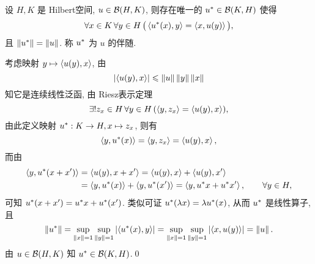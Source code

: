 \begin{Theorem}[伴随算子]
	设 $ H, K $ 是 Hilbert空间, $ u\in \mathcal{B}(H, K) $, 则存在唯一的 $ u^{*}\in \mathcal{B}(K, H) $ 使得
	\[
		\forall x\in K\,\forall y\in H\,\big(\left\langle u^{*}(x), y \right\rangle=\left\langle x, u(y) \right\rangle\big),
	\]
	且 $ \left\| u^{*} \right\|=\left\| u \right\| $. 称 $ u^{*} $ 为 $ u $ 的伴随.
\end{Theorem}

\begin{Proof}
	考虑映射 $ y\mapsto\left\langle u(y), x \right\rangle $, 由
	\[
		\left| \left\langle u(y), x \right\rangle \right| \leqslant\left\| u \right\|\left\| y \right\|\left\| x \right\|
	\]
	知它是连续线性泛函, 由 Riesz表示定理
	\[
		\exists!z_{x}\in H\,\forall y\in H\,(\left\langle y, z_{x} \right\rangle=\left\langle u(y), x \right\rangle),
	\]
	由此定义映射 $ u^{*}: K\to H, x\mapsto z_{x} $, 则有
	\[
		\left\langle y, u^{*}(x) \right\rangle=\left\langle y, z_{x} \right\rangle=\left\langle u(y), x \right\rangle,
	\]
	而由
	\[
		\begin{aligned}
			\left\langle y, u^{*}(x+x') \right\rangle & =\left\langle u(y), x+x' \right\rangle=\left\langle u(y), x \right\rangle+\left\langle u(y), x' \right\rangle                                                    \\
			                            & =\left\langle y, u^{*}(x) \right\rangle+\left\langle y, u^{*}(x') \right\rangle=\left\langle y, u^{*}x+u^{*}x' \right\rangle, \qquad \forall y\in H,
		\end{aligned}
	\]
	可知 $ u^{*}(x+x')=u^{*}x+u^{*}(x') $. 类似可证 $ u^{*}(\lambda x)=\lambda u^{*}(x) $, 从而 $ u^{*}  $ 是线性算子, 且
	\[
		\left\| u^{*} \right\|=\sup_{\left\| x \right\|=1}\sup_{\left\| y \right\|=1}\left| \left\langle u^{*}(x), y \right\rangle \right| =\sup_{\left\| x \right\|=1}\sup_{\left\| y \right\|=1}\left| \left\langle x, u(y) \right\rangle \right| =\left\| u \right\|.
	\]
	由 $ u\in \mathcal{B}(H, K) $ 知 $ u^{*}\in\mathcal{B}(K, H) $.\qed
\end{Proof}

